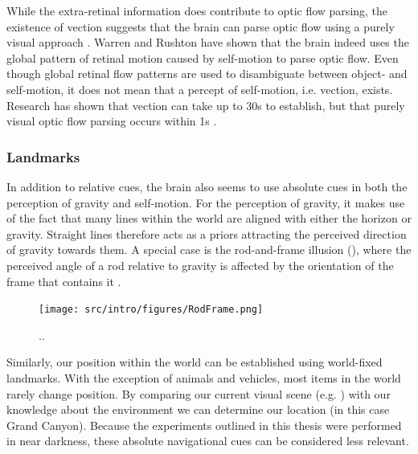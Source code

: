 While the extra-retinal information does contribute to optic flow parsing, the existence of vection \cite{dichgans1978} suggests that the brain can parse optic flow using a purely visual approach \cite{rushton2005,warren2007}. Warren and Rushton \citeyear{warren2009} have shown that the brain indeed uses the global pattern of retinal motion caused by self-motion to parse optic flow. Even though global retinal flow patterns are used to disambiguate between object- and self-motion, it does not mean that a percept of self-motion, i.e. vection, exists. Research has shown that vection can take up to 30s to establish, but that purely visual optic flow parsing occurs within 1s \cite{warren2009}.

\subsubsection{Landmarks}
In addition to relative cues, the brain also seems to use absolute cues in both the perception of gravity and self-motion. For the perception of gravity, it makes use of the fact that many lines within the world are aligned with either the horizon or gravity. Straight lines therefore acts as a priors attracting the perceived direction of gravity towards them. A special case is the rod-and-frame illusion (), where the perceived angle of a rod relative to gravity is affected by the orientation of the frame that contains it \cite{witkin1948}. 

\begin{figure}
	\texttt{[image: src/intro/figures/RodFrame.png]}
	\caption{..}
	\label{intro:fig9}
\end{figure}

Similarly, our position within the world can be established using world-fixed landmarks. With the exception of animals and vehicles, most items in the world rarely change position. By comparing our current visual scene (e.g. ) with our knowledge about the environment we can determine our location (in this case Grand Canyon). Because the experiments outlined in this thesis were performed in near darkness, these absolute navigational cues can be considered less relevant. 

